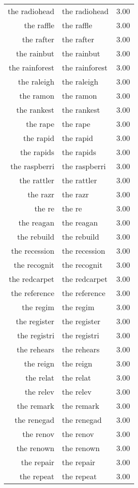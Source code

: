 \begin{table}[ht]
\begin{tabular}{rlr}
  the radiohead & the radiohead & 3.00 \\ 
  the raffle & the raffle & 3.00 \\ 
  the rafter & the rafter & 3.00 \\ 
  the rainbut & the rainbut & 3.00 \\ 
  the rainforest & the rainforest & 3.00 \\ 
  the raleigh & the raleigh & 3.00 \\ 
  the ramon & the ramon & 3.00 \\ 
  the rankest & the rankest & 3.00 \\ 
  the rape & the rape & 3.00 \\ 
  the rapid & the rapid & 3.00 \\ 
  the rapids & the rapids & 3.00 \\ 
  the raspberri & the raspberri & 3.00 \\ 
  the rattler & the rattler & 3.00 \\ 
  the razr & the razr & 3.00 \\ 
  the re & the re & 3.00 \\ 
  the reagan & the reagan & 3.00 \\ 
  the rebuild & the rebuild & 3.00 \\ 
  the recession & the recession & 3.00 \\ 
  the recognit & the recognit & 3.00 \\ 
  the redcarpet & the redcarpet & 3.00 \\ 
  the reference & the reference & 3.00 \\ 
  the regim & the regim & 3.00 \\ 
  the register & the register & 3.00 \\ 
  the registri & the registri & 3.00 \\ 
  the rehears & the rehears & 3.00 \\ 
  the reign & the reign & 3.00 \\ 
  the relat & the relat & 3.00 \\ 
  the relev & the relev & 3.00 \\ 
  the remark & the remark & 3.00 \\ 
  the renegad & the renegad & 3.00 \\ 
  the renov & the renov & 3.00 \\ 
  the renown & the renown & 3.00 \\ 
  the repair & the repair & 3.00 \\ 
  the repeat & the repeat & 3.00 \\ 

\end{tabular}
\end{table}
